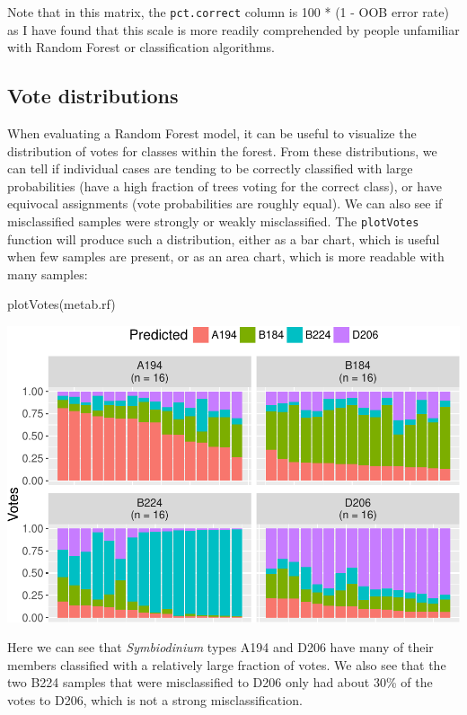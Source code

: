 Note that in this matrix, the \texttt{pct.correct} column is 100 * (1 -
OOB error rate) as I have found that this scale is more readily
comprehended by people unfamiliar with Random Forest or classification
algorithms.

\subsection{Vote distributions}\label{vote-distributions}

When evaluating a Random Forest model, it can be useful to visualize the
distribution of votes for classes within the forest. From these
distributions, we can tell if individual cases are tending to be
correctly classified with large probabilities (have a high fraction of
trees voting for the correct class), or have equivocal assignments (vote
probabilities are roughly equal). We can also see if misclassified
samples were strongly or weakly misclassified. The \texttt{plotVotes}
function will produce such a distribution, either as a bar chart, which
is useful when few samples are present, or as an area chart, which is
more readable with many samples:

\begin{Schunk}
\begin{Sinput}
plotVotes(metab.rf)
\end{Sinput}

\includegraphics{archer_files/figure-latex/plotVotes-1} \end{Schunk}

Here we can see that \emph{Symbiodinium} types A194 and D206 have many
of their members classified with a relatively large fraction of votes.
We also see that the two B224 samples that were misclassified to D206
only had about 30\% of the votes to D206, which is not a strong
misclassification.

